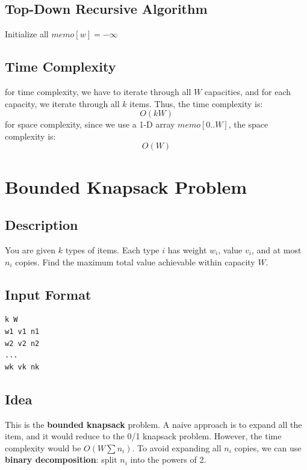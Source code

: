 \documentclass[a4paper,12pt]{article}
\begin{document}
\subsection*{Top-Down Recursive Algorithm}
\begin{algorithm}[H]
\caption{Top-Down Unbounded Knapsack}
Initialize all $memo[w] = -\infty$\;

\;
\end{algorithm}

\subsection*{Time Complexity}
for time complexity, we have to iterate through all $W$ capacities,
and for each capacity, we iterate through all $k$ items.
Thus, the time complexity is:\[O(kW)\]
for space complexity, since we use a 1-D array $memo[0..W]$,
the space complexity is:\[O(W)\]

\section{Bounded Knapsack Problem}
\subsection*{Description}
You are given $k$ types of items.  
Each type $i$ has weight $w_i$, value $v_i$, and at most $n_i$ copies.  
Find the maximum total value achievable within capacity $W$.
\subsection*{Input Format}
\begin{verbatim}
k W
w1 v1 n1
w2 v2 n2
...
wk vk nk
\end{verbatim}
\subsection*{Idea}
This is the \textbf{bounded knapsack} problem.  
A naive approach is to expand all the item, and it would reduce to the 0/1 knapsack problem.
However, the time complexity would be $O(W \sum n_i)$.
To avoid expanding all $n_i$ copies, we can use \textbf{binary decomposition}:
split $n_i$ into the powers of 2.
\end{document}
